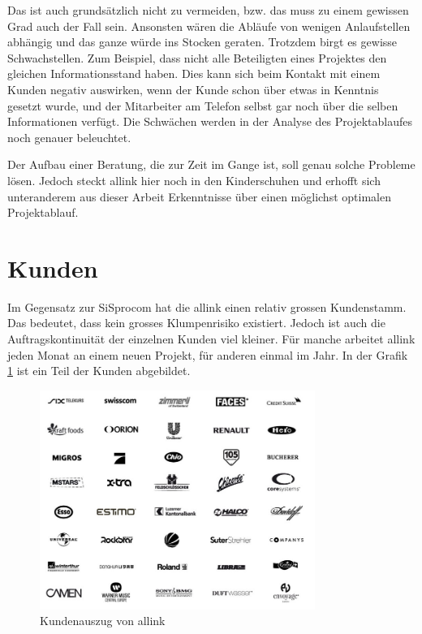 Das ist auch grundsätzlich nicht zu vermeiden, bzw. das muss zu einem gewissen
Grad auch der Fall sein. Ansonsten wären die Abläufe von wenigen Anlaufstellen abhängig
und das ganze würde ins Stocken geraten. Trotzdem birgt es gewisse Schwachstellen.
Zum Beispiel, dass nicht alle Beteiligten eines Projektes den gleichen Informationsstand 
haben. Dies kann sich beim Kontakt mit einem Kunden negativ auswirken, wenn der
Kunde schon über etwas in Kenntnis gesetzt wurde, und der Mitarbeiter am
Telefon selbst gar noch über die selben Informationen verfügt. Die Schwächen 
werden in der Analyse des Projektablaufes noch genauer beleuchtet.

Der Aufbau einer Beratung, die zur Zeit im Gange ist, soll genau solche Probleme
lösen. Jedoch steckt allink hier noch in den Kinderschuhen und erhofft sich
unteranderem aus dieser Arbeit Erkenntnisse über einen möglichst optimalen 
Projektablauf.

\section{Kunden}
Im Gegensatz zur SiSprocom hat die allink einen relativ grossen Kundenstamm.
Das bedeutet, dass kein grosses Klumpenrisiko existiert. Jedoch ist auch
die Auftragskontinuität der einzelnen Kunden viel kleiner. Für manche arbeitet
allink jeden Monat an einem neuen Projekt, für anderen einmal im Jahr.
In der Grafik \ref{pic:kundenauszug} ist ein Teil der Kunden abgebildet.

\begin{figure}[htbp]
\begin{center}
\includegraphics[width=0.8\textwidth,angle=0]{./bilder/analyse/kundenauszug.jpg}
\caption{Kundenauszug von allink}
\label{pic:kundenauszug}
\end{center}
\end{figure}

